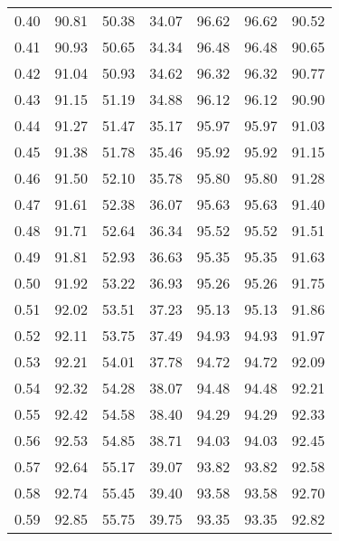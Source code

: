 \begin{tabular}{|c|c|c|c|c|c|c|}
      0.40 &     90.81 &     50.38 &      34.07 &   96.62 &      96.62 &         90.52 \\
      0.41 &     90.93 &     50.65 &      34.34 &   96.48 &      96.48 &         90.65 \\
      0.42 &     91.04 &     50.93 &      34.62 &   96.32 &      96.32 &         90.77 \\
      0.43 &     91.15 &     51.19 &      34.88 &   96.12 &      96.12 &         90.90 \\
      0.44 &     91.27 &     51.47 &      35.17 &   95.97 &      95.97 &         91.03 \\
      0.45 &     91.38 &     51.78 &      35.46 &   95.92 &      95.92 &         91.15 \\
      0.46 &     91.50 &     52.10 &      35.78 &   95.80 &      95.80 &         91.28 \\
      0.47 &     91.61 &     52.38 &      36.07 &   95.63 &      95.63 &         91.40 \\
      0.48 &     91.71 &     52.64 &      36.34 &   95.52 &      95.52 &         91.51 \\
      0.49 &     91.81 &     52.93 &      36.63 &   95.35 &      95.35 &         91.63 \\
      0.50 &     91.92 &     53.22 &      36.93 &   95.26 &      95.26 &         91.75 \\
      0.51 &     92.02 &     53.51 &      37.23 &   95.13 &      95.13 &         91.86 \\
      0.52 &     92.11 &     53.75 &      37.49 &   94.93 &      94.93 &         91.97 \\
      0.53 &     92.21 &     54.01 &      37.78 &   94.72 &      94.72 &         92.09 \\
      0.54 &     92.32 &     54.28 &      38.07 &   94.48 &      94.48 &         92.21 \\
      0.55 &     92.42 &     54.58 &      38.40 &   94.29 &      94.29 &         92.33 \\
      0.56 &     92.53 &     54.85 &      38.71 &   94.03 &      94.03 &         92.45 \\
      0.57 &     92.64 &     55.17 &      39.07 &   93.82 &      93.82 &         92.58 \\
      0.58 &     92.74 &     55.45 &      39.40 &   93.58 &      93.58 &         92.70 \\
      0.59 &     92.85 &     55.75 &      39.75 &   93.35 &      93.35 &         92.82 \\

\end{tabular}
